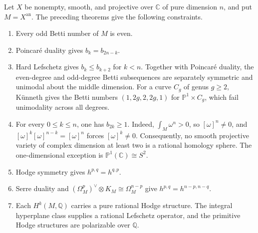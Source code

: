 \documentclass[11pt,reqno]{amsart}
\theoremstyle{definition}
\theoremstyle{remark}
\newcommand{\C}{\mathbb{C}}
\newcommand{\Q}{\mathbb{Q}}
\newcommand{\PP}{\mathbb{P}}
\newcommand{\Xan}{X^{\mathrm{an}}}
\begin{document}
Let $X$ be nonempty, smooth, and projective over $\C$ of pure dimension $n$,
and put $M=\Xan$. The preceding theorems give the following constraints.
\begin{enumerate}
  \item Every odd Betti number of $M$ is even.
  \item Poincar\'e duality gives $b_k=b_{2n-k}$.
  \item Hard Lefschetz gives $b_k\leq b_{k+2}$ for $k<n$. Together with
  Poincar\'e duality, the even-degree and odd-degree Betti subsequences are
  separately symmetric and unimodal about the middle dimension. For a
  curve $C_g$ of genus $g\geq2$, K\"unneth gives the Betti numbers
  $(1,2g,2,2g,1)$ for $\PP^1\times C_g$, which fail unimodality across
  all degrees.
  \item For every $0\leq k\leq n$, one has $b_{2k}\geq1$. Indeed,
  $\int_M\omega^n>0$, so $[\omega]^n\neq0$, and
  $[\omega]^k[\omega]^{n-k}=[\omega]^n$ forces $[\omega]^k\neq0$.
  Consequently, no smooth projective variety of complex dimension at least two
  is a rational homology sphere. The one-dimensional exception is
  $\PP^1(\C)\cong S^2$.
  \item Hodge symmetry gives $h^{p,q}=h^{q,p}$.
  \item Serre duality and $(\Omega_M^p)^\vee\otimes K_M\cong\Omega_M^{n-p}$
  give $h^{p,q}=h^{n-p,n-q}$.
  \item Each $H^k(M,\Q)$ carries a pure rational Hodge structure. The integral
  hyperplane class supplies a rational Lefschetz operator, and the primitive
  Hodge structures are polarizable over $\Q$.
\end{enumerate}
\end{document}
